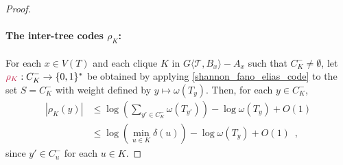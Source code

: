 \documentclass{patmorin}
\makeatletter
\renewcommand{\le}{\leqslant}
\def\mathcolor#1#{\@mathcolor{#1}}
\def\@mathcolor#1#2#3{%
  \protect\leavevmode
  \begingroup
    \color#1{#2}#3%
  \endgroup
}
\newcommand{\mathdefin}[1]{\mathcolor{brightmaroon}{#1}}
\newcommand{\torso}[2]{{#1}\langle{#2}\rangle}
\newcommand{\Oh}{O}
\newcommand{\calT}{\mathcal{T}}
\makeatother
\begin{document}
\begin{proof}
  \paragraph{\boldmath The inter-tree codes $\rho_K$:}

  For each $x\in V(T)$ and each clique $K$ in $\torso{G}{\calT,B_x}-A_x$ such that $C^-_K\neq\emptyset$, let $\mathdefin{\rho_K}:C^-_K\to\{0,1\}^*$ be obtained by applying \cref{shannon_fano_elias_code} to the set $S=C^-_K$ with weight defined by $y\mapsto\omega(T_y)$.  Then, for each $y\in C^-_K$, 
  \begin{align}
    |\rho_K(y)|
      & \le 
      \textstyle\log\left(\sum_{y'\in C^-_K}\omega(T_{y'})\right) - \log\omega(T_y) + \Oh(1) \nonumber \\
      & \le \log(\min_{u\in K}\delta(u)) - \log\omega(T_y) + \Oh(1) \enspace ,
      \label{rho_K_y_upper_bound}
  \end{align}
  since $y'\in C^-_u$ for each $u\in K$.


\end{proof}
\end{document}
